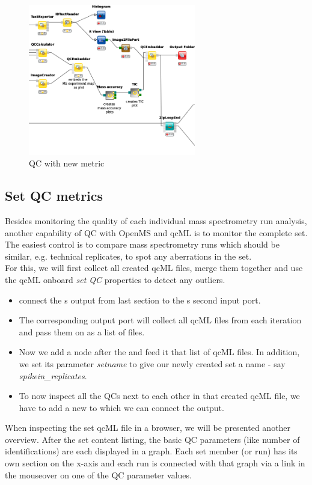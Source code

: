 \begin{figure}[htbp]
  \centering
  \includegraphics[width=0.65\textwidth]{graphics/qc/qc_extra}
  \caption{QC with new metric}
  \label{fig:qc_extra}
\end{figure}

\subsection{Set QC metrics}
\label{Set QC metrics}

Besides monitoring the quality of each individual mass spectrometry run analysis, another capability of QC with OpenMS and qcML is to monitor the complete set. The easiest control is to compare mass spectrometry runs which should be similar, e.g. technical replicates, to spot any aberrations in the set.\\
For this, we will first collect all created qcML files, merge them together and use the qcML onboard \textit{set QC} properties to detect any outliers.

\begin{itemize}
\item connect the s output from last section to the s second input port. 
\item The corresponding output port will collect all qcML files from each  iteration and pass them on as a list of files.
\item Now we add a  node after the  and feed it that list of qcML files. In addition, we set its parameter \textit{setname} to give our newly created set a name - say \textit{spikein\_replicates}.
\item To now inspect all the QCs next to each other in that created qcML file, we have to add a new  to which we can connect the  output.
\end{itemize}
\newpage
When inspecting the set qcML file in a browser, we will be presented another overview. After the set content listing, the basic QC parameters (like number of identifications) are each displayed in a graph. Each set member (or run) has its own section on the x-axis and each run is connected with that graph via a link in the mouseover on one of the QC parameter values.


